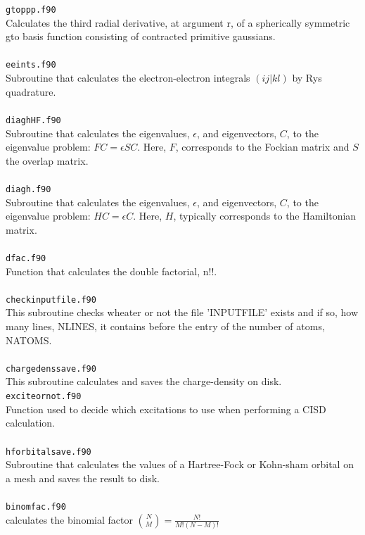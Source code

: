 \documentclass[a4paper,twoside,openany]{book}
\begin{document}
{{\texttt{gtoppp.f90}\\
Calculates the third radial derivative, at argument r, of a spherically
symmetric gto basis function consisting of contracted primitive gaussians. \\ \\
\texttt{eeints.f90}\\
Subroutine that calculates the electron-electron integrals $(ij|kl)$ by Rys quadrature. \\ \\
\texttt{diaghHF.f90} \\
Subroutine that calculates the eigenvalues, $\epsilon$, and eigenvectors, $C$, to the eigenvalue problem: $FC=\epsilon SC$. Here, $F$, corresponds to the 
Fockian matrix and $S$ the overlap matrix.\\ \\
\texttt{diagh.f90} \\
Subroutine that calculates the eigenvalues, $\epsilon$, and eigenvectors, $C$, to the eigenvalue problem: $HC=\epsilon C$. Here, $H$, typically corresponds to the 
Hamiltonian matrix. \\ \\
\texttt{dfac.f90}\\
Function that calculates the double factorial, n!!. \\ \\
\texttt{checkinputfile.f90}\\
This subroutine checks wheater or not the file 'INPUTFILE'
exists and if so, how many lines, NLINES, it contains before the entry of
the number of atoms, NATOMS. \\ \\
\texttt{chargedenssave.f90}\\
This subroutine calculates and  saves  the  charge-density on disk. 
\newpage
\noindent
\texttt{exciteornot.f90}\\
Function used to decide which excitations to use when performing a CISD calculation. \\ \\
\texttt{hforbitalsave.f90}\\
Subroutine that calculates the values of a Hartree-Fock or Kohn-sham orbital on a mesh and saves the result to disk. \\ \\
\texttt{binomfac.f90}\\
calculates the binomial factor
 $ \binom {N} {M}= \frac{N!}{M!(N-M)!}$\\ \\
}}
\end{document}
